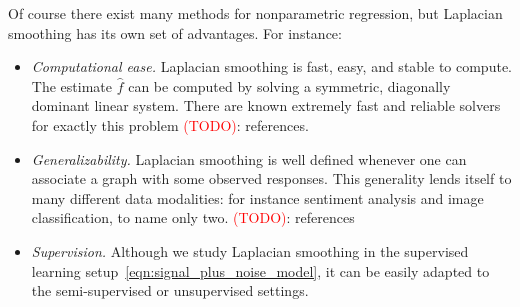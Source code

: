 \documentclass[twoside]{article}
\newcommand{\1}{\mathbf{1}}
\newcommand{\wh}[1]{\widehat{#1}}
\theoremstyle{definition}
\theoremstyle{remark}
\begin{document}
Of course there exist many methods for nonparametric regression, but Laplacian smoothing has its own set of advantages. For instance:
\begin{itemize}
	\item \emph{Computational ease.} Laplacian smoothing is fast, easy, and stable to compute. The estimate $\wh{f}$ can be computed by solving a symmetric, diagonally dominant linear system. There are known extremely fast and reliable solvers for exactly this problem \textcolor{red}{(TODO)}: references.
	\item \emph{Generalizability.} Laplacian smoothing is well defined whenever one can associate a graph with some observed responses. This generality lends itself to many different data modalities: for instance sentiment analysis and image classification, to name only two. \textcolor{red}{(TODO)}: references
	\item \emph{Supervision.} Although we study Laplacian smoothing in the supervised learning setup~\eqref{eqn:signal_plus_noise_model}, it can be easily adapted to the semi-supervised or unsupervised settings.
\end{itemize}
\end{document}
